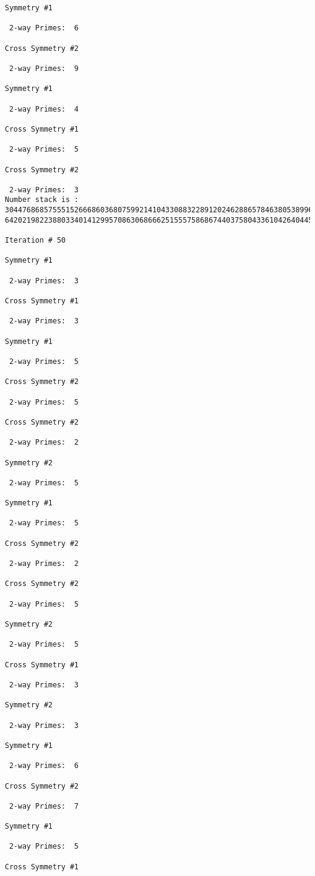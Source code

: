 {{{{\begin{verbatim}
Symmetry #1

 2-way Primes: 	6

Cross Symmetry #2

 2-way Primes: 	9

Symmetry #1

 2-way Primes: 	4

Cross Symmetry #1

 2-way Primes: 	5

Cross Symmetry #2

 2-way Primes: 	3
Number stack is :
30447686857555152666860368075992141043308832289120246288657846380538996794608835958544046240163340857
64202198223880334014129957086306866625155575868674403758043361042640445859538806497699835083648756882

Iteration #	50

Symmetry #1

 2-way Primes: 	3

Cross Symmetry #1

 2-way Primes: 	3

Symmetry #1

 2-way Primes: 	5

Cross Symmetry #2

 2-way Primes: 	5

Cross Symmetry #2

 2-way Primes: 	2

Symmetry #2

 2-way Primes: 	5

Symmetry #1

 2-way Primes: 	5

Cross Symmetry #2

 2-way Primes: 	2

Cross Symmetry #2

 2-way Primes: 	5

Symmetry #2

 2-way Primes: 	5

Cross Symmetry #1

 2-way Primes: 	3

Symmetry #2

 2-way Primes: 	3

Symmetry #1

 2-way Primes: 	6

Cross Symmetry #2

 2-way Primes: 	7

Symmetry #1

 2-way Primes: 	5

Cross Symmetry #1


\end{verbatim}}}}}
